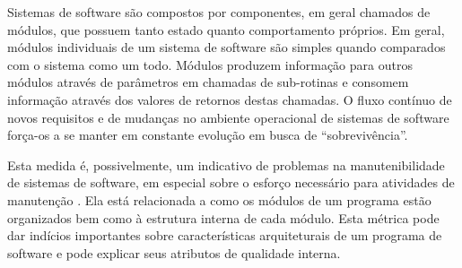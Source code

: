 Sistemas de software são compostos por componentes, em geral chamados de
módulos, que possuem tanto estado quanto comportamento próprios. Em geral,
módulos individuais de um sistema de software são simples quando comparados com
o sistema como um todo. Módulos produzem informação para outros módulos
através de parâmetros em chamadas de sub-rotinas e consomem informação através
dos valores de retornos destas chamadas. O fluxo contínuo de novos requisitos e
de mudanças no ambiente operacional de sistemas de software força-os a se
manter em constante evolução em busca de “sobrevivência”.

Esta medida é, possivelmente, um indicativo de problemas na manutenibilidade de
sistemas de software, em especial sobre o esforço necessário para atividades de
manutenção \cite{Terceiro2012}. Ela está relacionada a como os módulos de um
programa estão organizados bem como à estrutura interna de cada módulo. Esta
métrica pode dar indícios importantes sobre características arquiteturais de um
programa de software e pode explicar seus atributos de qualidade interna.

